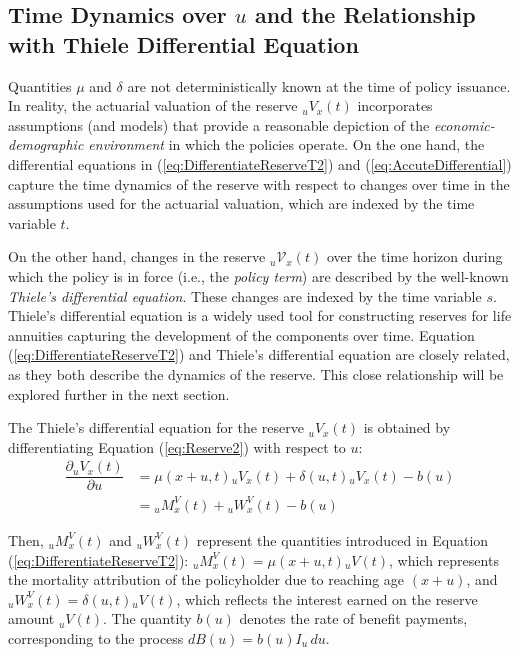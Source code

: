 \documentclass[12pt]{article}
\begin{document}
{\subsection{Time Dynamics over $u$ and the Relationship with Thiele Differential Equation}\label{sec:ThieleEquations}


Quantities \( \mu \) and \( \delta \) are not deterministically known at the time of policy issuance. In reality, the actuarial valuation of the reserve \( {}_uV_x(t) \) incorporates assumptions (and models) that provide a reasonable depiction of the \textit{economic-demographic environment} in which the policies operate. On the one hand, the differential equations in (\ref{eq:DifferentiateReserveT2}) and (\ref{eq:AccuteDifferential}) capture the time dynamics of the reserve with respect to changes over time in the assumptions used for the actuarial valuation, which are indexed by the time variable \( t \).

On the other hand, changes in the reserve \( {}_u\mathcal{V}_x(t) \) over the time horizon during which the policy is in force (i.e., the \textit{policy term}) are described by the well-known \textit{Thiele's differential equation}. These changes are indexed by the time variable \( s \). Thiele's differential equation is a widely used tool for constructing reserves for life annuities capturing the development of the components over time. Equation (\ref{eq:DifferentiateReserveT2}) and Thiele's differential equation are closely related, as they both describe the dynamics of the reserve. This close relationship will be explored further in the next section.

The Thiele's differential equation for the reserve \( {}_uV_x(t) \) is obtained by differentiating Equation (\ref{eq:Reserve2}) with respect to \( u \):
\begin{equation}\label{eq:Thiele}
	\begin{split}
		\dfrac{\partial {}_uV_x(t)}{\partial u}&= \mu(x+u,t){}_uV_x(t) + \delta(u,t){}_uV_x(t) - b(u) \\
		&= {}_uM^V_x(t) + {}_uW^V_x(t) - b(u)
	\end{split}
\end{equation}

Then, ${}_uM^V_x(t)$ and ${}_uW^V_x(t)$ represent the quantities introduced in Equation (\ref{eq:DifferentiateReserveT2}): ${}_uM^V_x(t) = \mu(x+u,t){}_uV(t)$, which represents the mortality attribution of the policyholder due to reaching age \( (x+u) \), and ${}_uW^V_x(t) = \delta(u,t){}_uV(t)$, which reflects the interest earned on the reserve amount ${}_uV(t)$. The quantity \( b(u) \) denotes the rate of benefit payments, corresponding to the process \( dB(u) = b(u) I_{u} \, du \).

}
\end{document}
